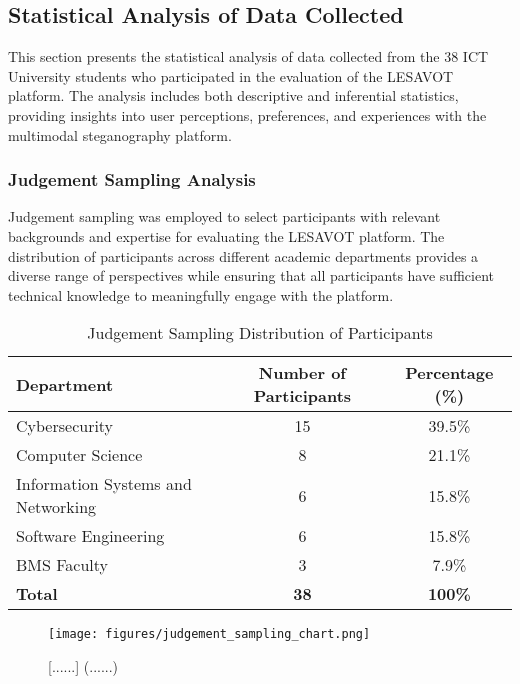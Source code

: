 \documentclass[12pt, a4paper, oneside]{book}
\begin{document}
\subsection{Statistical Analysis of Data Collected}

This section presents the statistical analysis of data collected from the 38 ICT University students who participated in the evaluation of the LESAVOT platform. The analysis includes both descriptive and inferential statistics, providing insights into user perceptions, preferences, and experiences with the multimodal steganography platform.

\subsubsection{Judgement Sampling Analysis}

Judgement sampling was employed to select participants with relevant backgrounds and expertise for evaluating the LESAVOT platform. The distribution of participants across different academic departments provides a diverse range of perspectives while ensuring that all participants have sufficient technical knowledge to meaningfully engage with the platform.

\begin{table}[htbp]
    \centering
    \caption{Judgement Sampling Distribution of Participants}
    \begin{tabular}{|l|c|c|}
        \hline
        \textbf{Department} & \textbf{Number of Participants} & \textbf{Percentage (\%)} \\
        \hline
        Cybersecurity & 15 & 39.5\% \\
        \hline
        Computer Science & 8 & 21.1\% \\
        \hline
        Information Systems and Networking & 6 & 15.8\% \\
        \hline
        Software Engineering & 6 & 15.8\% \\
        \hline
        BMS Faculty & 3 & 7.9\% \\
        \hline
        \textbf{Total} & \textbf{38} & \textbf{100\%} \\
        \hline
    \end{tabular}
    \label{tab:judgement_sampling}
\end{table}

\begin{figure}[htbp]
    \centering
    \texttt{[image: figures/judgement\_sampling\_chart.png]}
    \caption{[......] (......)}
    \label{fig:judgement_sampling_chart}
\end{figure}
\end{document}

